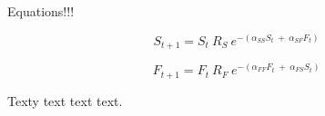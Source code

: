 \documentclass[12pt]{beamer}
\begin{document}
\begin{frame}

	\begin{center}
	{ \huge \textcolor{boss5}{Equations!!!}}
	\end{center}

\Large
	\begin{equation}
	S_{t+1} = S_{t} \ R_{S} \ e^{- (\alpha_{SS}S_{t} \ + \ \alpha_{SF}F_{t})}
	\end{equation}

	\begin{equation}
	F_{t+1} = F_{t} \ R_{F} \ e^{- (\alpha_{FF}F_{t} \ + \ \alpha_{FS}S_{t})}
	\end{equation}

\end{frame}


















\begin{frame}

	\begin{flushright}
	\Large \textcolor{boss2}{Texty text text text.} 
	\end{flushright}
\end{frame}
\end{document}
